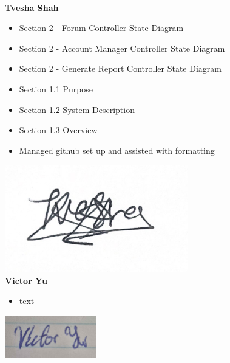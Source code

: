 \documentclass[]{article}
\numberwithin{figure}{section}
\begin{document}
\\
\textbf{Tvesha Shah}
\begin{itemize}
    \setlength\itemindent{2em}
    \item Section 2 - Forum Controller State Diagram 
    \item Section 2 - Account Manager Controller State Diagram 
    \item Section 2 - Generate Report Controller State Diagram 
    \item Section 1.1 Purpose
    \item Section 1.2 System Description
    \item Section 1.3 Overview
    \item Managed github set up and assisted with formatting
\end{itemize} 
\includegraphics[width=0.6\textwidth]{Tvesha.png}
\\
\textbf{Victor Yu}
\begin{itemize}
    \setlength\itemindent{2em}
    \item text
\end{itemize}
\includegraphics[width=0.3\textwidth]{Victor.png}
\end{document}
